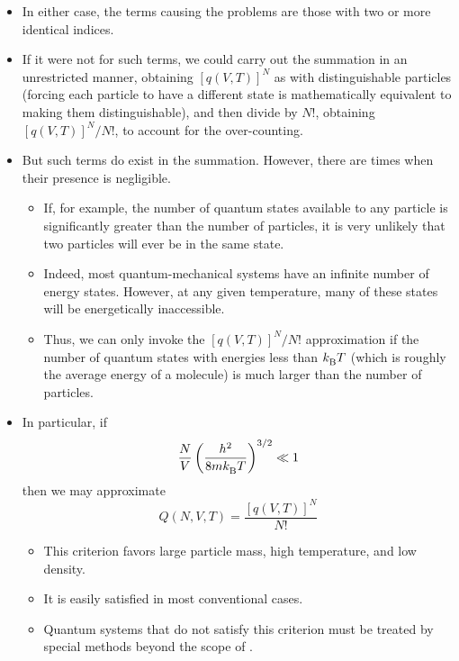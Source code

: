\documentclass[../notes.tex]{subfiles}
\begin{document}
\begin{itemize}
\begin{itemize}
\begin{itemize}
        \end{itemize}
        \item In either case, the terms causing the problems are those with two or more identical indices.
        \item If it were not for such terms, we could carry out the summation in an unrestricted manner, obtaining $[q(V,T)]^N$ as with distinguishable particles (forcing each particle to have a different state is mathematically equivalent to making them distinguishable), and then divide by $N!$, obtaining $[q(V,T)]^N/N!$, to account for the over-counting.
        \item But such terms do exist in the summation. However, there are times when their presence is negligible.
        \begin{itemize}
            \item If, for example, the number of quantum states available to any particle is significantly greater than the number of particles, it is very unlikely that two particles will ever be in the same state.
            \item Indeed, most quantum-mechanical systems have an infinite number of energy states. However, at any given temperature, many of these states will be energetically inaccessible.
            \item Thus, we can only invoke the $[q(V,T)]^N/N!$ approximation if the number of quantum states with energies less than ${k_\text{B}^{}} T$ (which is roughly the average energy of a molecule) is much larger than the number of particles.
        \end{itemize}
        \item In particular, if
        \begin{equation*}
            \frac{N}{V}\left( \frac{h^2}{8m{k_\text{B}^{}} T} \right)^{3/2} \ll  1
        \end{equation*}
        then we may approximate
        \begin{equation*}
            Q(N,V,T) = \frac{[q(V,T)]^N}{N!}
        \end{equation*}
        \begin{itemize}
            \item This criterion favors large particle mass, high temperature, and low density.
            \item It is easily satisfied in most conventional cases.
            \item Quantum systems that do not satisfy this criterion must be treated by special methods beyond the scope of \textcite{bib:McQuarrieSimon}.

\end{itemize}
\end{itemize}
\end{itemize}
\end{document}
